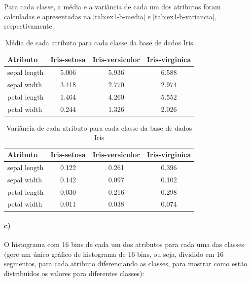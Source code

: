 \documentclass{article}
\begin{document}
Para cada classe, a média e a variância de cada um dos atributos foram calculadas e apresentadas na \autoref{tab:ex1-b-media} e \autoref{tab:ex1-b-variancia}, respectivamente.

\begin{table}[h]
	\centering
	\caption{Média de cada atributo para cada classe da base de dados Iris}
	\label{tab:ex1-b-media}
	\begin{tabular}{@{}lccc@{}}
		\toprule
		Atributo         & Iris-setosa & Iris-versicolor & Iris-virginica \\ \midrule
		sepal length     & 5.006       & 5.936           & 6.588          \\
		sepal width      & 3.418       & 2.770           & 2.974          \\
		petal length     & 1.464       & 4.260           & 5.552          \\
		petal width      & 0.244       & 1.326           & 2.026          \\ \bottomrule
	\end{tabular}
\end{table}

\begin{table}[h]
	\centering
	\caption{Variância de cada atributo para cada classe da base de dados Iris}
	\label{tab:ex1-b-variancia}
	\begin{tabular}{@{}lccc@{}}
		\toprule
		Atributo         & Iris-setosa & Iris-versicolor & Iris-virginica \\ \midrule
		sepal length     & 0.122       & 0.261           & 0.396          \\
		sepal width      & 0.142       & 0.097           & 0.102          \\
		petal length     & 0.030       & 0.216           & 0.298          \\
		petal width      & 0.011       & 0.038           & 0.074          \\ \bottomrule
	\end{tabular}
\end{table}

\paragraph{c)} O histograma com 16 bins de cada um dos atributos para cada uma das classes (gere um único gráfico de histograma de 16 bins, ou seja, dividido em 16 segmentos, para cada atributo diferenciando as classes, para mostrar como estão distribuídos os valores para diferentes classes):
\end{document}
